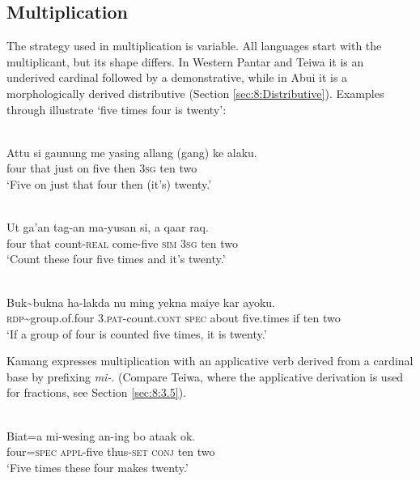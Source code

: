  

 

\subsection{Multiplication}
\label{sec:8:Multiplication}
The strategy used in multiplication is variable. All languages start with the multiplicant, but its shape differs. In Western Pantar and Teiwa it is an underived cardinal followed by a demonstrative, while in Abui it is a morphologically derived distributive (Section \ref{sec:8:Distributive}). Examples  through   illustrate `five times four is twenty':


\ea%
\label{bkm:Ref358043144}
  
\\
\gll Attu  si  gaunung  me  yasing   allang  (gang)  ke alaku. \\  
   four  that  just  on  five  then  3\textsc{sg } ten two   \\
\glt `Five on just that four then (it's) twenty.'
\z


\ea
\label{ex:8:1244}
\\ 
 \gll   Ut  ga'an  tag-an  ma-yusan  si,  a   qaar raq.  \\
    four  that   count-\textsc{real } come-five  \textsc{sim}  \textsc{3sg} ten two  \\
 \glt `Count these four five times and it's twenty.'
\z



\ea
\label{ex:8:1245}
\\ 
 \gll Buk\~{}bukna  ha-lakda  nu  ming  yekna  maiye  kar ayoku. \\
  \textsc{rdp}\~{}group.of.four  \textsc{3.pat}-count.\textsc{cont}  \textsc{spec}  about  five.times  if  ten two  \\
 \glt  `If a group of four is counted five times, it is twenty.'
\z

 

Kamang expresses multiplication with an applicative verb derived from a cardinal base by prefixing \textit{mi-}. (Compare Teiwa, where the applicative derivation is used for fractions, see Section \ref{sec:8:3.5}). 




\ea%
\label{bkm:Ref358043179}
\\
\gll   Biat=a  mi-wesing  an-ing  bo  ataak   ok.  \\  
    four=\textsc{spec}  \textsc{appl-}five  thus\textsc{-set}  \textsc{conj} ten  two   \\
\glt  `Five times these four makes twenty.'
\z


